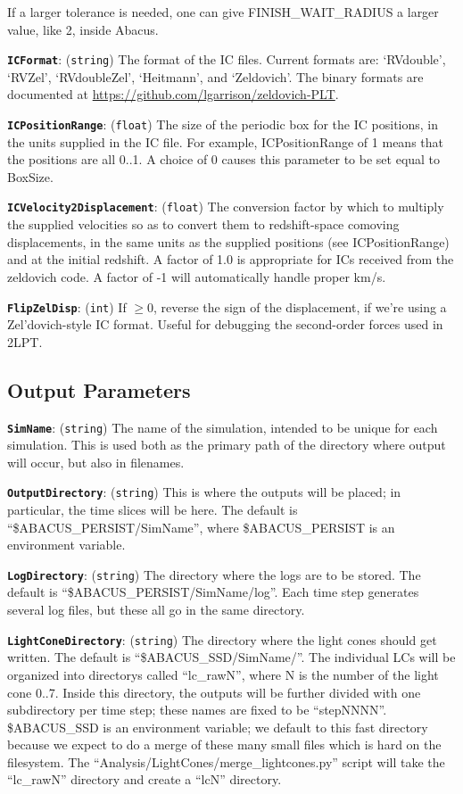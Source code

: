 \documentclass[11pt,preprint]{aastex}
\newcommand{\param}[2]{\medskip\noindent\textbf{\texttt{#1}}: ({\tt #2}) }
\begin{document}
If a larger tolerance is needed, one can give FINISH\_WAIT\_RADIUS a larger value, like 2, inside Abacus.

\param{ICFormat}{string} The format of the IC files.  Current formats
are: `RVdouble', `RVZel', `RVdoubleZel', `Heitmann', and `Zeldovich'.
The binary formats are documented at \url{https://github.com/lgarrison/zeldovich-PLT}.

\param{ICPositionRange}{float} The size of the periodic box for the 
IC positions, in the units supplied in the IC file.  For example, 
ICPositionRange of 1 means that the positions are all 0..1.  A choice
of 0 causes this parameter to be set equal to BoxSize.

\param{ICVelocity2Displacement}{float} The conversion factor by which
to multiply the supplied velocities so as to convert them to redshift-space
comoving displacements, in the same units as the supplied positions (see
ICPositionRange) and at the initial redshift.  A factor of 1.0 is appropriate
for ICs received from the zeldovich code.  A factor of -1 will automatically
handle proper km/s.

\param{FlipZelDisp}{int} If $\ge0$, reverse the sign of the displacement, if we're using a Zel'dovich-style IC format.
Useful for debugging the second-order forces used in 2LPT.

\subsection{Output Parameters}

\param{SimName}{string} The name of the simulation, intended to be unique
for each simulation.  This is used both as the primary path of the directory
where output will occur, but also in filenames.

\param{OutputDirectory}{string} This is where the outputs will be
placed; in particular, the time slices will be here.  The default is
``\$ABACUS\_PERSIST/SimName'', where \$ABACUS\_PERSIST is an environment variable.

\param{LogDirectory}{string} The directory where the logs are to be
stored.  The default is ``\$ABACUS\_PERSIST/SimName/log''.  Each time step
generates several log files, but these all go in the same directory.

\param{LightConeDirectory}{string} The directory where the light
cones should get written.  The default is ``\$ABACUS\_SSD/SimName/''.
The individual LCs will be organized into directorys called ``lc\_rawN'', where N is the number
of the light cone 0..7.
Inside this directory, the outputs will be further divided with one 
subdirectory per time step; these names are fixed to be ``stepNNNN''.
\$ABACUS\_SSD is an environment variable; we default to this fast
directory because we expect to do a merge of these many small files which is hard on the filesystem.
The ``Analysis/LightCones/merge\_lightcones.py'' script will take the
``lc\_rawN'' directory and create a ``lcN'' directory.
\end{document}
